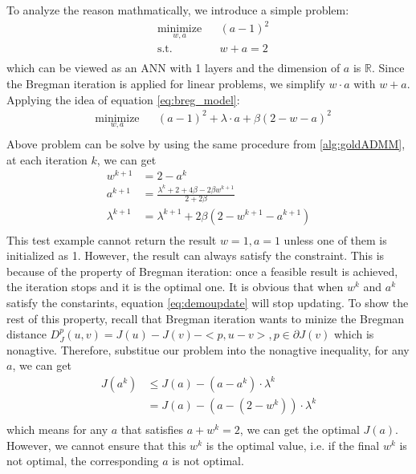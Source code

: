 \documentclass[letterpaper, 10 pt, conference]{ieeeconf}  %
\begin{document}
To analyze the reason mathmatically, we introduce a simple problem:
\begin{equation}
\begin{aligned}
& \underset{w,a}{\text{minimize}}  & & (a-1)^2 \\
& \text{s.t.} & & w+a =2\\
\end{aligned}
\label{eq:demo}
\end{equation}
which can be viewed as an ANN with 1 layers and the dimension of $a$ is $\mathbb{R}$. Since the Bregman iteration is applied for linear problems, we simplify $w \cdot a$ with $w + a$. Applying the idea of equation \eqref{eq:breg_model}:
\begin{equation}
\begin{aligned}
& \underset{w,a}{\text{minimize}}  & & (a-1)^2 + \lambda \cdot a + \beta (2-w-a)^2\\
\end{aligned}
\end{equation}
Above problem can be solve by using the same procedure from \ref{alg:goldADMM}, at each iteration $k$, we can get
\begin{equation}
\begin{aligned}
w^{k+1} &= 2-a^k \\
a^{k+1} &= \frac{\lambda^k+2+4\beta-2\beta w^{k+1}}{2+2\beta}\\
\lambda^{k+1} &= \lambda^{k+1} + 2\beta(2-w^{k+1}-a^{k+1})\\
\end{aligned}
\label{eq:demoupdate}
\end{equation}
This test example cannot return the result $w=1,a=1$ unless one of them is initialized as 1. However, the result can always satisfy the constraint. This is because of the property of Bregman iteration: once a feasible result is achieved, the iteration stops and it is the optimal one. It is obvious that when $w^k$ and $a^k$ satisfy the constarints, equation \eqref{eq:demoupdate} will stop updating. To show the rest of this property, recall that Bregman iteration wants to minize the Bregman distance $D^p_J(u,v) = J(u)-J(v)-<p,u-v>, p \in \partial J(v)$ which is nonagtive. Therefore, substitue our problem into the nonagtive inequality, for any $a$, we can get
\begin{equation}
\begin{aligned}
J(a^k) & \leq J(a) -(a-a^k) \cdot \lambda^k \\
& = J(a) - (a-(2-w^k)) \cdot \lambda^k \\
\end{aligned}
\end{equation}
which means for any $a$ that satisfies $a+w^k=2$, we can get the optimal $J(a)$. However, we cannot ensure that this $w^k$ is the optimal value, i.e. if the final $w^k$ is not optimal, the corresponding $a$ is not optimal.
\end{document}
